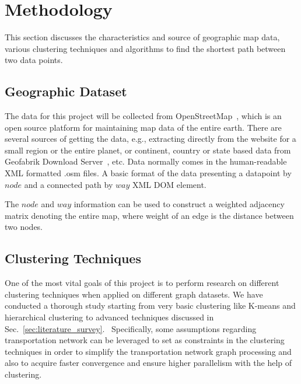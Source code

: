 \section{Methodology}
\label{sec:methodology}

This section discusses the characteristics and source of geographic map data,
various clustering techniques and algorithms to find the shortest
path between two data points.

\subsection{Geographic Dataset}
The data for this project will be collected from OpenStreetMap~\cite{osm},
which is an open source platform for maintaining map data of the entire earth.
There are several sources of getting the data, e.g., extracting directly from
the website for a small region or the entire planet, or continent, country or
state based data from Geofabrik Download Server~\cite{geo_dl_server}, etc.
Data normally comes in the human-readable XML formatted .osm files.
A basic format of the data presenting a datapoint by
$node$ and a connected path by $way$ XML DOM element.

The $node$ and $way$ information can be used to construct a weighted adjacency
matrix denoting the entire map, where weight of an edge is the distance between
two nodes.


\subsection{Clustering Techniques}
One of the most vital goals of this project is to perform research on different
clustering techniques when applied on different graph datasets. We have conducted a thorough study starting from very basic clustering like K-means
and hierarchical clustering to advanced techniques discussed in
Sec.~\ref{sec:literature_survey}.~\cite{structural_attribute_similarity_clustering, deep_representation_graph_clustering, parallel_graph_algorithm}
Specifically, some assumptions regarding transportation network can be leveraged
to set as constraints in the clustering techniques in order to simplify the transportation network graph processing and also to acquire faster convergence and ensure higher parallelism with the help of clustering. 
